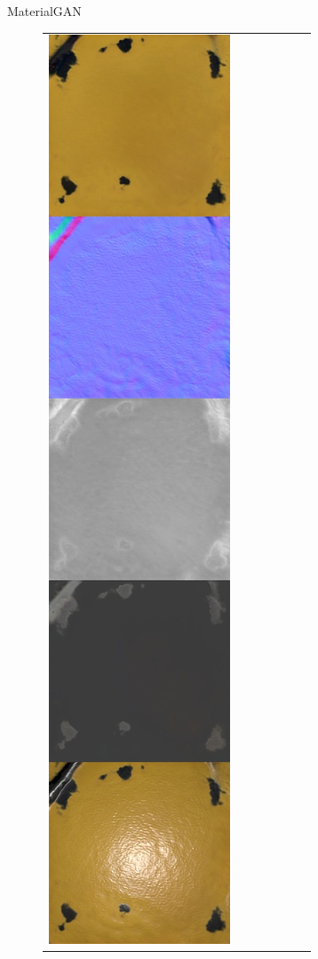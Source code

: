 \documentclass[final]{beamer}
\newlength{\twocolwid}
\newlength{\resLen}
\begin{document}
\begin{frame}[t]
\begin{columns}[t]
\begin{column}{\twocolwid}
\begin{block}{MaterialGAN}
\begin{figure}
\begin{tabular}{ccccccc}
					\includegraphics[width=\resLen]{others/matgan/08.jpg} &

\end{tabular}
\end{figure}
\end{block}
\end{column}
\end{columns}
\end{frame}
\end{document}

